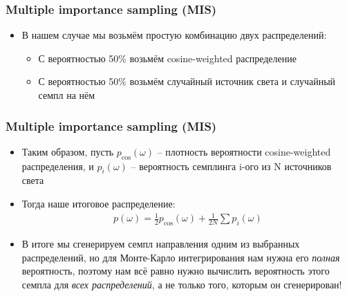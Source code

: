 \documentclass[10pt]{beamer}
\begin{document}
\begin{frame}
\frametitle{Multiple importance sampling (MIS)}
\begin{itemize}
\item В нашем случае мы возьмём простую комбинацию двух распределений:
\pause
\begin{itemize}
\item С вероятностью 50\% возьмём cosine-weighted распределение
\pause
\item С вероятностью 50\% возьмём случайный источник света и случайный семпл на нём
\end{itemize}
\end{itemize}
\end{frame}

\begin{frame}
\frametitle{Multiple importance sampling (MIS)}
\begin{itemize}
\item Таким образом, пусть \begin{math}p_{\cos}(\omega)\end{math} -- плотность вероятности cosine-weighted распределения, и \begin{math}p_i(\omega)\end{math} -- вероятность семплинга i-ого из N источников света
\pause
\item Тогда наше итоговое распределение:
\begin{gather*}
p(\omega) = \frac{1}{2}p_{\cos}(\omega) + \frac{1}{2N}\sum p_i(\omega)
\end{gather*}
\pause
\item В итоге мы сгенерируем семпл направления одним из выбранных распределений, но для Монте-Карло интегрирования нам нужна его \textit{полная} вероятность, поэтому нам всё равно нужно вычислить вероятность этого семпла для \textit{всех распределений}, а не только того, которым он сгенерирован!
\end{itemize}
\end{frame}
\end{document}
